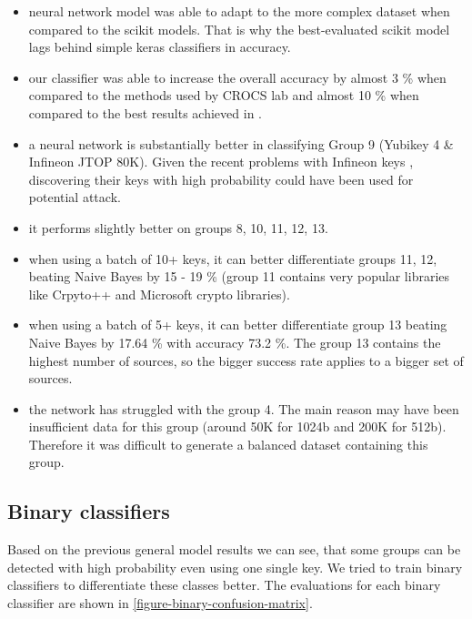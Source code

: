 \begin{itemize}

\item neural network model was able to adapt to the more complex dataset when compared to the scikit models. That is why the best-evaluated scikit model lags behind simple keras classifiers in accuracy.

\item our classifier was able to increase the overall accuracy by almost 3 \% when compared to the methods used by CROCS lab and almost 10 \% when compared to the best results achieved in \cite{thesis_sekan}.

\item a neural network is substantially better in classifying Group 9 (Yubikey 4 \& Infineon JTOP 80K). Given the recent problems with Infineon keys \cite{svenda_2}, discovering their keys with high probability could have been used for potential attack.

\item it performs slightly better on groups 8, 10, 11, 12, 13. 

\item when using a batch of 10+ keys, it can better differentiate groups 11, 12, beating Naive Bayes by 15 - 19 \% (group 11 contains very popular libraries like Crpyto++ and Microsoft crypto libraries).

\item when using a batch of 5+ keys, it can better differentiate group 13 beating Naive Bayes by 17.64 \% with accuracy 73.2 \%. The group 13 contains the highest number of sources, so the bigger success rate applies to a bigger set of sources.

\item the network has struggled with the group 4. The main reason may have been insufficient data for this group (around 50K for 1024b and 200K for 512b). Therefore it was difficult to generate a balanced dataset containing this group.

\end{itemize}

\subsection*{Binary classifiers}

Based on the previous general model results we can see, that some groups can be detected with high probability even using one single key. We tried to train binary classifiers to differentiate these classes better. The evaluations for each binary classifier are shown in \autoref{figure-binary-confusion-matrix}.

